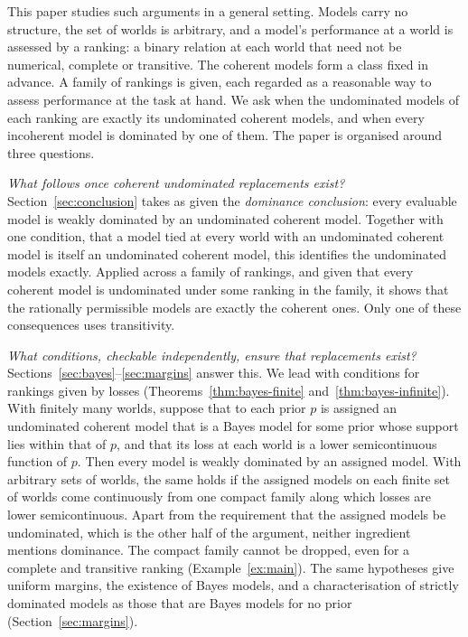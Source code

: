 \documentclass[11pt]{article}
\theoremstyle{definition}
\theoremstyle{remark}
\begin{document}
This paper studies such arguments in a general setting. Models carry no structure, the set of worlds is arbitrary, and a model's performance at a world is assessed by a ranking: a binary relation at each world that need not be numerical, complete or transitive. The coherent models form a class fixed in advance. A family of rankings is given, each regarded as a reasonable way to assess performance at the task at hand. We ask when the undominated models of each ranking are exactly its undominated coherent models, and when every incoherent model is dominated by one of them. The paper is organised around three questions.

\emph{What follows once coherent undominated replacements exist?} Section~\ref{sec:conclusion} takes as given the \emph{dominance conclusion}: every evaluable model is weakly dominated by an undominated coherent model. Together with one condition, that a model tied at every world with an undominated coherent model is itself an undominated coherent model, this identifies the undominated models exactly. Applied across a family of rankings, and given that every coherent model is undominated under some ranking in the family, it shows that the rationally permissible models are exactly the coherent ones. Only one of these consequences uses transitivity.

\emph{What conditions, checkable independently, ensure that replacements exist?} Sections~\ref{sec:bayes}--\ref{sec:margins} answer this. We lead with conditions for rankings given by losses (Theorems~\ref{thm:bayes-finite} and~\ref{thm:bayes-infinite}). With finitely many worlds, suppose that to each prior $p$ is assigned an undominated coherent model that is a Bayes model for some prior whose support lies within that of $p$, and that its loss at each world is a lower semicontinuous function of $p$. Then every model is weakly dominated by an assigned model. With arbitrary sets of worlds, the same holds if the assigned models on each finite set of worlds come continuously from one compact family along which losses are lower semicontinuous. Apart from the requirement that the assigned models be undominated, which is the other half of the argument, neither ingredient mentions dominance. The compact family cannot be dropped, even for a complete and transitive ranking (Example~\ref{ex:main}). The same hypotheses give uniform margins, the existence of Bayes models, and a characterisation of strictly dominated models as those that are Bayes models for no prior (Section~\ref{sec:margins}).
\end{document}
